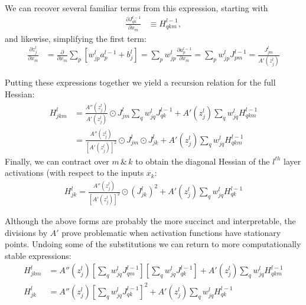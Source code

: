 \documentclass{article}
\begin{document}
We can recover several familiar terms from this expression, starting with
\begin{align}
\frac{\partial J_{qk}^{l-1}}{\partial x_m} &\equiv H_{qkm}^{l-1},
\end{align}
\indent and likewise, simplifying the first term:
\begin{align}
\frac{\partial z_j^l}{\partial x_m} 
&= \frac{\partial}{\partial x_m} \sum_p \left[ w_{jp}^l a_p^{l-1} + b_j^l \right]
= \sum_p w_{jp}^l \frac{\partial a_p^{l-1}}{\partial x_m}
= \sum_p w_{jp}^l J_{pm}^{l-1}
= \frac{J_{jm}^l}{A'(z_j^l)}
\end{align}

Putting these expressions together we yield a recursion relation for the full Hessian:
\begin{align}
H_{jkm}^l &= \frac{A''(z_j^l)}{A'(z_j^l)} \odot J_{jm}^l \sum_q w_{jq}^l J_{qk}^{l-1} + A'(z_j^l) \sum_q w_{jq}^l H_{qkm}^{l-1} \\
&= \frac{A''(z_j^l)}{\left[ A'(z_j^l) \right]^2} \odot J_{jm}^l \odot J_{jk}^l + A'(z_j^l) \sum_q w_{jq}^l H_{qkm}^{l-1}
\end{align}
Finally, we can contract over \(m \, \text{\&} \, k \) to obtain the diagonal Hessian of the \(l^{th}\) layer activations (with respect to the inputs \(x_k\):
\begin{align}
H_{jk}^l = \frac{A''(z_j^l)}{\left[ A'(z_j^l) \right]^2} \odot ( J_{jk}^l )^2+ A'(z_j^l) \sum_q w_{jq}^l H_{qk}^{l-1}
\end{align}

Although the above forms are probably the more succinct and interpretable, the divisions by \(A'\) prove problematic when activation functions have stationary points. Undoing some of the substitutions we can return to more computationally stable expressions:
\begin{align}
H_{jkm}^l &= A''(z_j^l) \left[ \sum_q w_{jq}^l J_{qm}^{l-1} \right] \left[ \sum_q w_{jq}^l J_{qk}^{l-1} \right] + A'(z_j^l) \sum_q w_{jq}^l H_{qkm}^{l-1} \\
H_{jk}^l &= A''(z_j^l) \left[ \sum_q w_{jq}^l J_{qk}^{l-1} \right]^2 + A'(z_j^l) \sum_q w_{jq}^l H_{qk}^{l-1}
\end{align}
\end{document}
